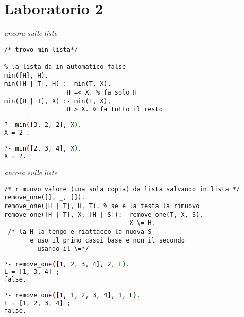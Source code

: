 \documentclass[a4paper,12pt, oneside]{book}
\begin{document}
\section{Laboratorio 2}
\begin{esercizio}
\textit{ancora sulle liste}
\begin{verbatim}
/* trovo min lista*/

% la lista da in automatico false
min([H], H).
min([H | T], H) :- min(T, X),
                 H =< X. % fa solo H
min([H | T], X) :- min(T, X),
                 H > X. % fa tutto il resto

\end{verbatim}
\begin{shaded}
\begin{lstlisting}[language=bash]
?- min([3, 2, 2], X).
X = 2 .

?- min([2, 3, 4], X).
X = 2.
\end{lstlisting}
\end{shaded}
\end{esercizio}
\begin{esercizio}
\textit{ancora sulle liste}
\begin{verbatim}
/* rimuovo valore (una sola copia) da lista salvando in lista */
remove_one([], _, []).
remove_one([H | T], H, T). % se è la testa la rimuovo
remove_one([H | T], X, [H | S]):- remove_one(T, X, S),
                                  X \= H.
 /* la H la tengo e riattacco la nuova S
       e uso il primo casoi base e non il secondo
         usando il \=*/
\end{verbatim}
\begin{shaded}
\begin{lstlisting}[language=bash]
?- remove_one([1, 2, 3, 4], 2, L).
L = [1, 3, 4] ;
false.

?- remove_one([1, 1, 2, 3, 4], 1, L).
L = [1, 2, 3, 4] ;
false.
\end{lstlisting}
\end{shaded}
\end{esercizio}
\end{document}
